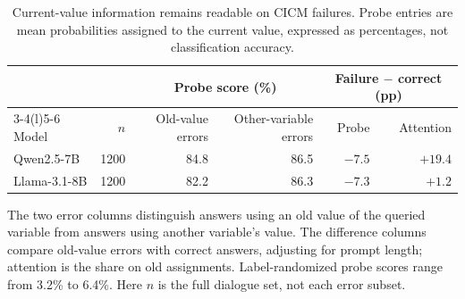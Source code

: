 \begin{table}[htbp]
\centering
\footnotesize
\setlength{\tabcolsep}{5pt}
\caption{Current-value information remains readable on CICM failures.
Probe entries are mean probabilities assigned to the current value, expressed
as percentages, not classification accuracy.}
\label{tab:retention-attention}
\begin{tabular}{@{}lr rrrr@{}}
\toprule
 & & \multicolumn{2}{c}{Probe score (\%)} &
 \multicolumn{2}{c}{Failure $-$ correct (pp)} \\
\cmidrule(lr){3-4}\cmidrule(l){5-6}
Model & $n$ & Old-value errors & Other-variable errors & Probe & Attention \\
\midrule
Qwen2.5-7B   & 1200 & 84.8 & 86.5 & $-7.5$ & $+19.4$ \\
Llama-3.1-8B & 1200 & 82.2 & 86.3 & $-7.3$ & $+1.2$ \\
\bottomrule
\end{tabular}
\vspace{3pt}\parbox{\linewidth}{\footnotesize
The two error columns distinguish answers using an old value of the queried
variable from answers using another variable's value. The difference columns
compare old-value errors with correct answers, adjusting for prompt length;
attention is the share on old assignments. Label-randomized probe scores
range from 3.2\% to 6.4\%. Here $n$ is the full dialogue set, not each error subset.}
\end{table}
